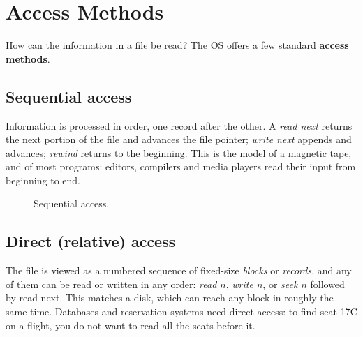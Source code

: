 \documentclass[11pt,a4paper]{article}
\newcommand{\term}[1]{\textbf{\color{mintdeep}#1}}
\begin{document}
\section{Access Methods}

How can the information in a file be read? The OS offers a few standard \term{access methods}.

\subsection{Sequential access}

Information is processed in order, one record after the other. A \emph{read next} returns the next portion of the file and advances the file pointer; \emph{write next} appends and advances; \emph{rewind} returns to the beginning. This is the model of a magnetic tape, and of most programs: editors, compilers and media players read their input from beginning to end.

\begin{figure}[H]
\centering
{}
\caption{Sequential access.}
\end{figure}

\subsection{Direct (relative) access}

The file is viewed as a numbered sequence of fixed-size \emph{blocks} or \emph{records}, and any of them can be read or written in any order: \emph{read $n$}, \emph{write $n$}, or \emph{seek $n$} followed by read next. This matches a disk, which can reach any block in roughly the same time. Databases and reservation systems need direct access: to find seat 17C on a flight, you do not want to read all the seats before it.
\end{document}
